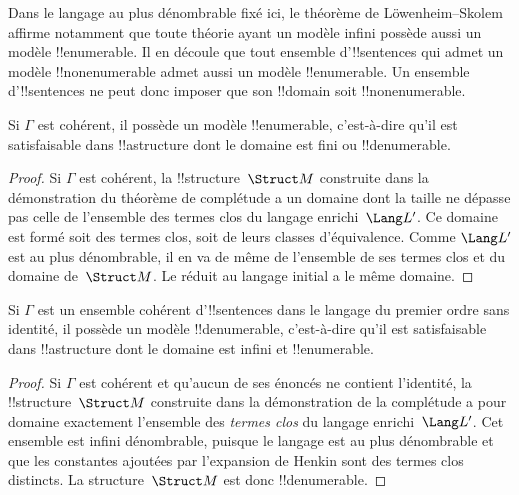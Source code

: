 \documentclass[../../../include/open-logic-section]{subfiles}
\begin{document}

Dans le langage au plus dénombrable fixé ici, le théorème de
Löwenheim--Skolem affirme notamment que toute théorie ayant un
modèle infini possède aussi un modèle !!{enumerable}.
Il en découle que tout ensemble d'!!{sentence}s qui admet un
modèle !!{nonenumerable} admet aussi un modèle !!{enumerable}.
Un ensemble d'!!{sentence}s ne peut donc imposer que son
!!{domain} soit !!{nonenumerable}.

\begin{thm}
Si $\Gamma$ est cohérent, il possède un modèle !!{enumerable},
c'est-à-dire qu'il est satisfaisable dans !!a{structure} dont le
domaine est fini ou !!{denumerable}.
\end{thm}

\begin{proof}
Si $\Gamma$ est cohérent, la !!{structure}~$\Struct M$ construite
dans la démonstration du théorème de complétude a un domaine dont la
taille ne dépasse pas celle de l'ensemble des termes clos du
langage enrichi~$\Lang L'$. Ce domaine est formé soit des termes
clos, soit de leurs classes d'équivalence. Comme $\Lang L'$ est
au plus dénombrable, il en va de même de l'ensemble de ses termes
clos et du domaine de~$\Struct M$. Le réduit au langage initial
a le même domaine.
\end{proof}

\begin{thm}
Si $\Gamma$ est un ensemble cohérent d'!!{sentence}s dans le
langage du premier ordre sans identité, il possède un modèle
!!{denumerable}, c'est-à-dire qu'il est satisfaisable dans !!a{structure}
dont le domaine est infini et !!{enumerable}.
\end{thm}

\begin{proof}
Si $\Gamma$ est cohérent et qu'aucun de ses énoncés ne contient
l'identité, la !!{structure}~$\Struct M$ construite dans la
démonstration de la complétude a pour domaine exactement l'ensemble
des \emph{termes clos} du langage enrichi~$\Lang L'$.
Cet ensemble est infini dénombrable, puisque le langage est au
plus dénombrable et que les constantes ajoutées par l'expansion
de Henkin sont des termes clos distincts. La structure~$\Struct M$
est donc !!{denumerable}.
\end{proof}
\end{document}
